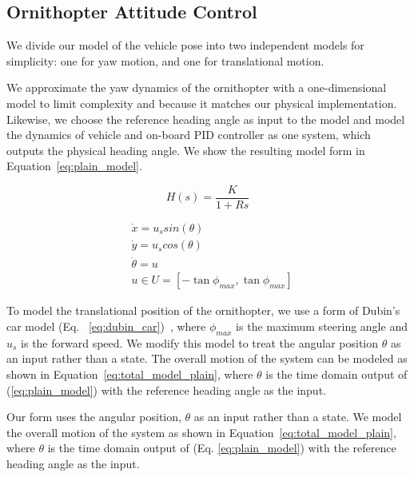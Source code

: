 \documentclass{aamas2013}
\begin{document}
\subsection{Ornithopter Attitude Control}
\label{sec:model_attitude}

We divide our model of the vehicle pose into two independent models for simplicity: one for
yaw motion, and one for translational motion.

We approximate the yaw dynamics of the ornithopter with a one-dimensional model to limit complexity and because it matches our physical implementation. Likewise, we choose the reference heading angle as input to the model and model the dynamics of vehicle and on-board PID controller as one system, which outputs the physical heading angle. We show the resulting model form in Equation~\ref{eq:plain_model}.

\begin{equation}
\label{eq:plain_model}
H(s) = \frac{K}{1 + Rs}
\end{equation}

\begin{equation}
\label{eq:dubin_car}
\begin{aligned}
& \dot{x} = u_{s}sin(\theta)\\
& \dot{y} = u_{s}cos(\theta)\\
& \dot{\theta} = u\\
& u \in U=[-\tan{\phi_{max}},\tan{\phi_{max}}]
\end{aligned}
\end{equation}

To model the translational position of the ornithopter, we use a form of Dubin's car model (Eq. ~\ref{eq:dubin_car})~\cite{lavalle:planning}, where $\phi_{max}$ is the maximum steering angle and $u_{s}$ is the forward speed. We modify this model to treat the angular position $\theta$ as an input rather than a state. The overall motion of the system can be modeled as shown in Equation~\ref{eq:total_model_plain}, where $\theta$ is the time domain output of (\ref{eq:plain_model}) with the reference heading angle as the input.

Our form uses the angular position, $\theta$ as an input rather than a state. We model the overall motion of the system as shown in Equation~\ref{eq:total_model_plain}, where $\theta$ is the time domain output of (Eq. \ref{eq:plain_model}) with the reference heading angle as the input.
\end{document}
